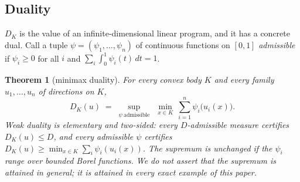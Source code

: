 \documentclass[11pt,reqno]{amsart}
\theoremstyle{plain}
\newtheorem{theorem}{Theorem}[section]
\theoremstyle{definition}
\theoremstyle{remark}
\begin{document}
\subsection*{Duality}
$D_K$ is the value of an infinite-dimensional linear program, and it has a
concrete dual. Call a tuple $\psi=(\psi_1,\dots,\psi_n)$ of continuous
functions on $[0,1]$ \emph{admissible} if $\psi_i\ge0$ for all $i$ and
$\sum_i\int_0^1\psi_i(t)\,dt=1$.

\begin{theorem}[minimax duality]\label{thm:duality}
For every convex body $K$ and every family $u_1,\dots,u_n$ of directions on
$K$,
\[
D_K(u)\;=\;\sup_{\psi\ \mathrm{admissible}}\ \ \min_{x\in K}\
\sum_{i=1}^n\psi_i\bigl(u_i(x)\bigr).
\]
Weak duality is elementary and two-sided: every $D$-admissible measure
certifies $D_K(u)\le D$, and every admissible $\psi$ certifies
$D_K(u)\ge\min_{x\in K}\sum_i\psi_i(u_i(x))$. The supremum is unchanged if the
$\psi_i$ range over bounded Borel functions. We do \emph{not} assert that the
supremum is attained in general; it is attained in every exact example of
this paper.
\end{theorem}
\end{document}
